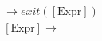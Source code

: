 \documentclass[11pt]{article}
\begin{document}
\begin{align}
    [\text{Exit}] \to exit([\text{Expr}])
    \\
    [\text{Expr}] \to
\end{align}
\end{document}
